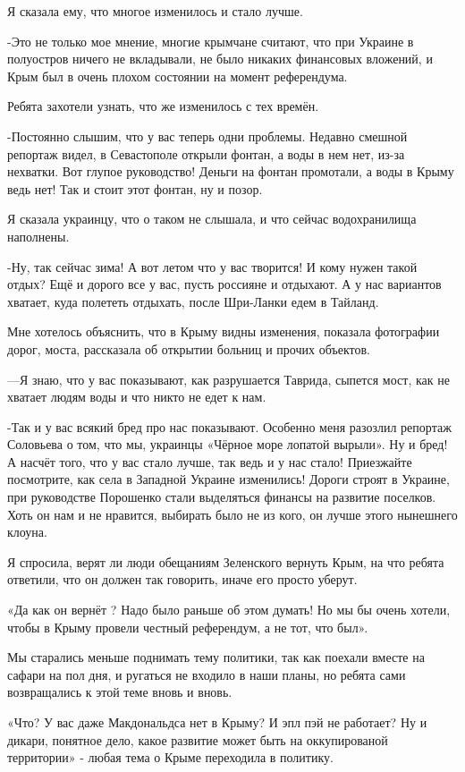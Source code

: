 Я сказала ему, что многое изменилось и стало лучше. 

-Это не только мое мнение, многие крымчане считают, что при Украине в
полуостров ничего не вкладывали, не было никаких финансовых вложений, и Крым
был в очень плохом состоянии на момент референдума.

Ребята захотели узнать, что же изменилось с тех времён.

-Постоянно слышим, что у вас теперь одни проблемы. Недавно смешной репортаж
видел, в Севастополе открыли фонтан, а воды в нем нет, из-за нехватки. Вот
глупое руководство! Деньги на фонтан промотали, а воды в Крыму ведь нет! Так и
стоит этот фонтан, ну и позор.

Я сказала украинцу, что о таком не слышала, и что сейчас водохранилища
наполнены.

-Ну, так сейчас зима! А вот летом что у вас творится! И кому нужен такой отдых?
Ещё и дорого все у вас, пусть россияне и отдыхают. А у нас вариантов хватает,
куда полететь отдыхать, после Шри-Ланки едем в Тайланд. 

Мне хотелось объяснить, что в Крыму видны изменения, показала фотографии дорог,
моста, рассказала об открытии больниц и прочих объектов. 

—Я знаю, что у вас показывают, как разрушается Таврида, сыпется мост, как не
хватает людям воды и что никто не едет к нам. 

-Так и у вас всякий бред про нас показывают. Особенно меня разозлил репортаж
Соловьева о том, что мы, украинцы «Чёрное море лопатой вырыли». Ну и бред! А
насчёт того, что у вас стало лучше, так ведь и у нас стало! Приезжайте
посмотрите, как села в Западной Украине изменились! Дороги строят в Украине,
при руководстве Порошенко стали выделяться финансы на развитие поселков. Хоть
он нам и не нравится, выбирать было не из кого, он лучше этого нынешнего
клоуна.

Я спросила, верят ли люди обещаниям Зеленского вернуть Крым, на что ребята
ответили, что он должен так говорить, иначе его просто уберут.

«Да как он вернёт ? Надо было раньше об этом думать! Но мы бы очень хотели,
чтобы в Крыму провели честный референдум, а не тот, что был».

Мы старались меньше поднимать тему политики, так как поехали вместе на сафари
на пол дня, и ругаться не входило в наши планы, но ребята сами возвращались к
этой теме вновь и вновь.

«Что? У вас даже Макдональдса нет в Крыму? И эпл пэй не работает? Ну и дикари,
понятное дело, какое развитие может быть на оккупированой территории» - любая
тема о Крыме переходила в политику.

